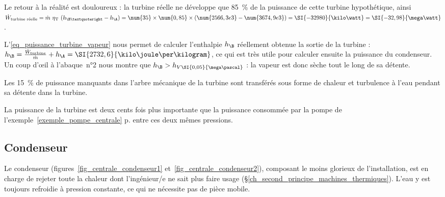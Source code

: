 \begin{anexample}
\begin{answer}
					Le retour à la réalité est douloureux : la turbine réelle ne développe que \SI{85}{\percent} de la puissance de cette turbine hypothétique, ainsi $\dot{W}_\text{turbine réelle} = \dot{m} \ \eta_\text{T} \ (h_{\B’} - h_\A) = \num{35} \times \num{0,85} \times (\num{2566,3e3} - \num{3674,9e3}) = \SI{-32 980}{\kilo\watt} = \SI{-32,98}{\mega\watt}$.
						\begin{remark}L’\cref{eq_puissance_turbine_vapeur} nous permet de calculer l’enthalpie $h_\B$ réellement obtenue la sortie de la turbine : $h_\B = \frac{\dot W_\text{turbine}}{\dot m} + h_\A = \SI{2732,6}{\kilo\joule\per\kilogram}$, ce qui est très utile pour calculer ensuite la puissance du condenseur. Un coup d’œil à l’abaque~n°2 nous montre que $h_\B > h_{V \SI{0,05}{\mega\pascal}}$ : la vapeur est donc sèche tout le long de sa détente.\end{remark}
						\begin{remark}Les \SI{15}{\percent} de puissance manquants dans l’arbre mécanique de la turbine sont transférés sous forme de chaleur et turbulence à l’eau pendant sa détente dans la turbine.\end{remark}
						\begin{remark}La puissance de la turbine est deux cents fois plus importante que la puissance consommée par la pompe de l’exemple~\ref{exemple_pompe_centrale} p.\pageref{exemple_pompe_centrale} entre ces deux mêmes pressions.\end{remark}
				\end{answer}
				\onlyframabook{\vspace{-0.4cm}}
		\end{anexample}

	\subsection{Condenseur}

		Le condenseur (figures~\ref{fig_centrale_condenseur1} et~\ref{fig_centrale_condenseur2}), composant le moins glorieux de l’installation, est en charge de rejeter toute la chaleur dont l’ingénieur/e ne sait plus faire usage (\S\ref{ch_second_principe_machines_thermiques}). L’eau y est toujours refroidie à pression constante, ce qui ne nécessite pas de pièce mobile.

